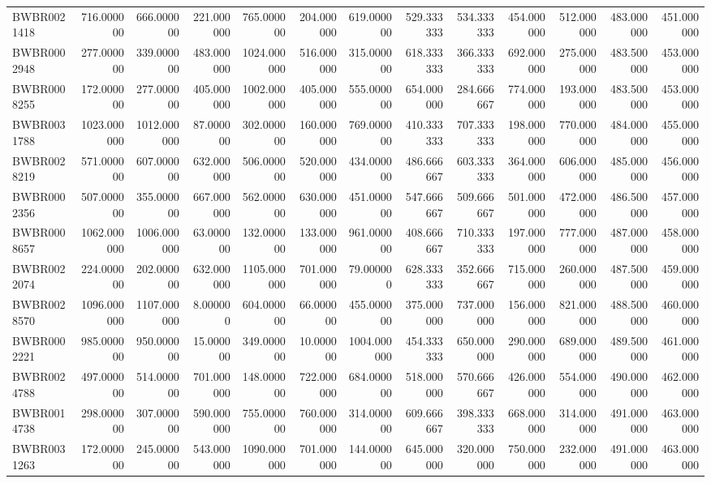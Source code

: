 \begin{longtable}{lrrrrrrrrrrrr}
BWBR0021418 & 716.000000 & 666.000000 & 221.000000 & 765.000000 & 204.000000 & 619.000000 & 529.333333 & 534.333333 & 454.000000 & 512.000000 & 483.000000 & 451.000000 \\
BWBR0002948 & 277.000000 & 339.000000 & 483.000000 & 1024.000000 & 516.000000 & 315.000000 & 618.333333 & 366.333333 & 692.000000 & 275.000000 & 483.500000 & 453.000000 \\
BWBR0008255 & 172.000000 & 277.000000 & 405.000000 & 1002.000000 & 405.000000 & 555.000000 & 654.000000 & 284.666667 & 774.000000 & 193.000000 & 483.500000 & 453.000000 \\
BWBR0031788 & 1023.000000 & 1012.000000 & 87.000000 & 302.000000 & 160.000000 & 769.000000 & 410.333333 & 707.333333 & 198.000000 & 770.000000 & 484.000000 & 455.000000 \\
BWBR0028219 & 571.000000 & 607.000000 & 632.000000 & 506.000000 & 520.000000 & 434.000000 & 486.666667 & 603.333333 & 364.000000 & 606.000000 & 485.000000 & 456.000000 \\
BWBR0002356 & 507.000000 & 355.000000 & 667.000000 & 562.000000 & 630.000000 & 451.000000 & 547.666667 & 509.666667 & 501.000000 & 472.000000 & 486.500000 & 457.000000 \\
BWBR0008657 & 1062.000000 & 1006.000000 & 63.000000 & 132.000000 & 133.000000 & 961.000000 & 408.666667 & 710.333333 & 197.000000 & 777.000000 & 487.000000 & 458.000000 \\
BWBR0022074 & 224.000000 & 202.000000 & 632.000000 & 1105.000000 & 701.000000 & 79.000000 & 628.333333 & 352.666667 & 715.000000 & 260.000000 & 487.500000 & 459.000000 \\
BWBR0028570 & 1096.000000 & 1107.000000 & 8.000000 & 604.000000 & 66.000000 & 455.000000 & 375.000000 & 737.000000 & 156.000000 & 821.000000 & 488.500000 & 460.000000 \\
BWBR0002221 & 985.000000 & 950.000000 & 15.000000 & 349.000000 & 10.000000 & 1004.000000 & 454.333333 & 650.000000 & 290.000000 & 689.000000 & 489.500000 & 461.000000 \\
BWBR0024788 & 497.000000 & 514.000000 & 701.000000 & 148.000000 & 722.000000 & 684.000000 & 518.000000 & 570.666667 & 426.000000 & 554.000000 & 490.000000 & 462.000000 \\
BWBR0014738 & 298.000000 & 307.000000 & 590.000000 & 755.000000 & 760.000000 & 314.000000 & 609.666667 & 398.333333 & 668.000000 & 314.000000 & 491.000000 & 463.000000 \\
BWBR0031263 & 172.000000 & 245.000000 & 543.000000 & 1090.000000 & 701.000000 & 144.000000 & 645.000000 & 320.000000 & 750.000000 & 232.000000 & 491.000000 & 463.000000 \\

\end{longtable}

